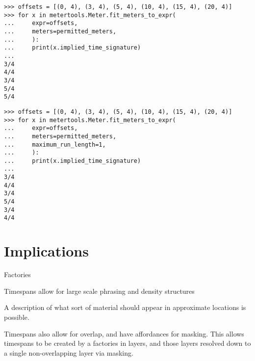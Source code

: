 \begin{comment}
<abjad>
offsets = [(0, 4), (3, 4), (5, 4), (10, 4), (15, 4), (20, 4)]
for x in metertools.Meter.fit_meters_to_expr(
    expr=offsets,
    meters=permitted_meters,
    ):
    print(x.implied_time_signature)

</abjad>
\end{comment}

\begin{singlespacing}
\vspace{-0.5\baselineskip}
\begin{lstlisting}
>>> offsets = [(0, 4), (3, 4), (5, 4), (10, 4), (15, 4), (20, 4)]
>>> for x in metertools.Meter.fit_meters_to_expr(
...     expr=offsets,
...     meters=permitted_meters,
...     ):
...     print(x.implied_time_signature)
...
3/4
4/4
3/4
5/4
5/4
\end{lstlisting}
\end{singlespacing}

\begin{comment}
<abjad>
offsets = [(0, 4), (3, 4), (5, 4), (10, 4), (15, 4), (20, 4)]
for x in metertools.Meter.fit_meters_to_expr(
    expr=offsets,
    meters=permitted_meters,
    maximum_run_length=1,
    ):
    print(x.implied_time_signature)

</abjad>
\end{comment}

\begin{singlespacing}
\vspace{-0.5\baselineskip}
\begin{lstlisting}
>>> offsets = [(0, 4), (3, 4), (5, 4), (10, 4), (15, 4), (20, 4)]
>>> for x in metertools.Meter.fit_meters_to_expr(
...     expr=offsets,
...     meters=permitted_meters,
...     maximum_run_length=1,
...     ):
...     print(x.implied_time_signature)
...
3/4
4/4
3/4
5/4
3/4
4/4
\end{lstlisting}
\end{singlespacing}

\section{Implications}

Factories

Timespans allow for large scale phrasing and density structures

A description of what sort of material should appear in approximate locations
is possible.

Timespans also allow for overlap, and have affordances for masking. This allows
timespans to be created by a factories in layers, and those layers resolved
down to a single non-overlapping layer via masking.